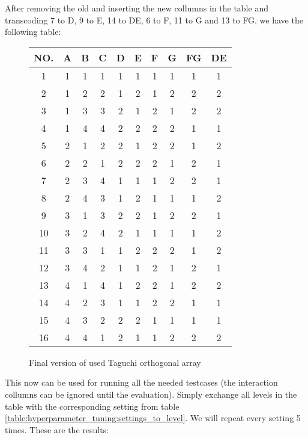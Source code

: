 After removing the old and inserting the new collumns in the table and transcoding 7 to D, 9 to E, 14 to DE, 6 to F, 11 to G and 13 to FG, we have the following table:

\begin{figure}[H]
	\centering
	\begin{tabular}{ |c||c|c|c|c|c|c|c|c|c|  }
		\hline
		NO.& A & B & C & D & E & F & G & FG& DE\\
		\hline
		1  & 1 & 1 & 1 & 1 & 1 & 1 & 1 & 1 & 1\\
		2  & 1 & 2 & 2 & 1 & 2 & 1 & 2 & 2 & 2\\
		3  & 1 & 3 & 3 & 2 & 1 & 2 & 1 & 2 & 2\\
		4  & 1 & 4 & 4 & 2 & 2 & 2 & 2 & 1 & 1\\
		5  & 2 & 1 & 2 & 2 & 1 & 2 & 2 & 1 & 2\\
		6  & 2 & 2 & 1 & 2 & 2 & 2 & 1 & 2 & 1\\
		7  & 2 & 3 & 4 & 1 & 1 & 1 & 2 & 2 & 1\\
		8  & 2 & 4 & 3 & 1 & 2 & 1 & 1 & 1 & 2\\
		9  & 3 & 1 & 3 & 2 & 2 & 1 & 2 & 2 & 1\\
		10 & 3 & 2 & 4 & 2 & 1 & 1 & 1 & 1 & 2\\
		11 & 3 & 3 & 1 & 1 & 2 & 2 & 2 & 1 & 2\\
		12 & 3 & 4 & 2 & 1 & 1 & 2 & 1 & 2 & 1\\
		13 & 4 & 1 & 4 & 1 & 2 & 2 & 1 & 2 & 2\\
		14 & 4 & 2 & 3 & 1 & 1 & 2 & 2 & 1 & 1\\
		15 & 4 & 3 & 2 & 2 & 2 & 1 & 1 & 1 & 1\\
		16 & 4 & 4 & 1 & 2 & 1 & 1 & 2 & 2 & 2\\
		\hline
	\end{tabular}
	\caption{Final version of used Taguchi orthogonal array}
\end{figure}


This now can be used for running all the needed testcases (the interaction collumns can be ignored until the evaluation). Simply exchange all levels in the table with the corresponding setting from table \ref{table:hyperparameter_tuning:settings_to_level}. We will repeat every setting 5 times. These are the results:


